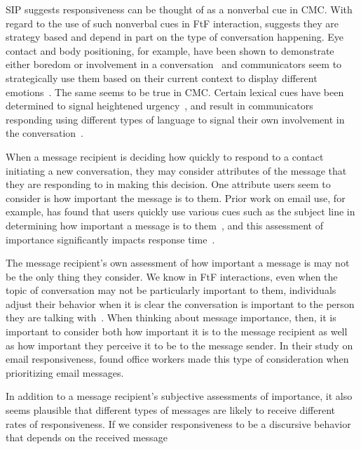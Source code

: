 \documentclass[12pt]{nuthesis}	%
\begin{document}
SIP suggests responsiveness can be thought of as a nonverbal cue in CMC. With regard to the use of such nonverbal cues in FtF interaction, \citet{levinson1981essential} suggests they are strategy based and depend in part on the type of conversation happening. Eye contact and body positioning, for example, have been shown to demonstrate either boredom or involvement in a conversation~\citep{jones2001effects} and communicators seem to strategically use them based on their current context to display different emotions~\citep{kangasharju2009emotions,svennevig2012interaction}. The same seems to be true in CMC. Certain lexical cues have been determined to signal heightened urgency~\citep{nguyen2014lexical}, and result in communicators responding using different types of language to signal their own involvement in the conversation~\citep{nguyen2016effects}.

When a message recipient is deciding how quickly to respond to a contact initiating a new conversation, they may consider attributes of the message that they are responding to in making this decision. One attribute users seem to consider is how important the message is to them. Prior work on email use, for example, has found that users quickly use various cues such as the subject line in determining how important a message is to them~\citep{wainer2011should}, and this assessment of importance significantly impacts response time~\citep{dabbish2005understanding}.

The message recipient's own assessment of how important a message is may not be the only thing they consider. We know in FtF interactions, even when the topic of conversation may not be particularly important to them, individuals adjust their behavior when it is clear the conversation is important to the person they are talking with~\citep{burleson1996comforting}. When thinking about message importance, then, it is important to consider both how important it is to the message recipient as well as how important they perceive it to be to the message sender. In their study on email responsiveness, \citet{tyler2003can} found office workers made this type of consideration when prioritizing email messages.

In addition to a message recipient's subjective assessments of importance, it also seems plausible that different types of messages are likely to receive different rates of responsiveness. If we consider responsiveness to be a discursive behavior that depends on the received message 
\end{document}
